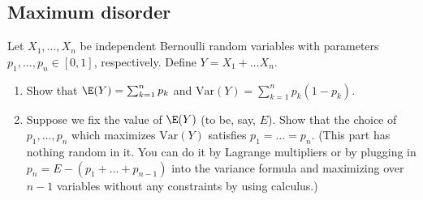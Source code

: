 \documentclass[12pt,reqno]{amsart}
\theoremstyle{definition}
\theoremstyle{remark}
\numberwithin{equation}{section}
\begin{document}
\subsection{Maximum disorder}
Let $X_{1},\ldots,X_{n}$ be independent Bernoulli random variables with parameters $p_{1},\ldots,p_{n}\in[0,1]$, respectively. Define $Y=X_{1}+\ldots X_{n}$.
\begin{enumerate}
\item Show that $\E(Y)=\sum_{k=1}^{n}p_{k}$ and $\mathrm{Var}(Y)=\sum_{k=1}^{n}p_{k}(1-p_{k})$. \item Suppose we fix the value of $\E(Y)$ (to be, say, $E$). Show that the choice of $p_{1},\ldots,p_{n}$ which maximizes $\mathrm{Var}(Y)$ satisfies $p_{1}=\ldots=p_{n}$. (This part has nothing random in it. You can do it by Lagrange multipliers or by plugging in $p_{n}=E-(p_{1}+\ldots+p_{n-1})$ into the variance formula and maximizing over $n-1$ variables without any constraints by using calculus.)
\end{enumerate}
\begin{comment}
\subsection{The FKG inequality}
For any $p\in[0,1]$, let $X(p)\sim\mathrm{Bern}(p)$. We say a function $f:\{0,1\}\to\R$ is increasing if $f(0)\leq f(1)$.
\begin{enumerate}
\item Compute $\E f(X(p))$ for any $p$ in terms of $f(0)$ and $f(1)$. Use this formula to explain why $\E f(X(p_{1}))\leq \E f(X(p_{2}))$ if $p_{1}\leq p_{2}$.
\item Explain briefly why the product of two increasing functions is increasing.
\item Suppose $p=\frac12$. Let $f,g:\{0,1\}\to\R$ be increasing functions such that $\E f(X(p))=0$ and $\E g(X(p))=0$. Show that $\mathrm{Cov}(f(X(p)),g(X(p)))=\E f(X(p))g(X(p))\geq0$.
\item Suppose $p=\frac12$. Let $f,g:\{0,1\}\to\R$ be increasing. Show $\mathrm{Cov}(f(X(p)),g(X(p)))\geq0$. (\emph{Hint}: covariance does not change if we shift $f(X(p))$ and $g(X(p))$ by constants. In other words, consider $h(x)=f(x)-\E f(X(p))$ and $j(x)=g(x)-\E g(X(p))$.)
\end{enumerate}
\end{comment}
\end{document}
